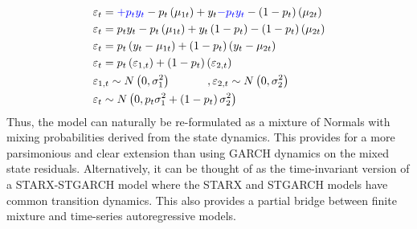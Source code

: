 \begin{equation}\label{eq:starmix}
\begin{gathered}
  {\varepsilon _t} =  {\color{blue}+ {p_t}{y_t}} - {p_t}\left( {{\mu _{1t}}}
  \right) + {y_t} {\color{blue} - {p_t}{y_t}} - \left( {1 - {p_t}} \right)\left(
  {{\mu _{2t}}} \right) \hfill \\
  {\varepsilon _t} = {p_t}{y_t} - {p_t}\left( {{\mu _{1t}}} \right) + {y_t}\left( {1 - {p_t}} \right) - \left( {1 - {p_t}} \right)\left( {{\mu _{2t}}} \right) \hfill \\
  {\varepsilon _t} = {p_t}\left( {{y_t} - {\mu _{1t}}} \right) + \left( {1 - {p_t}} \right)\left( {{y_t} - {\mu _{2t}}} \right) \hfill \\
  {\varepsilon _t} = {p_t}\left( {{\varepsilon _{1,t}}} \right) + \left( {1 - {p_t}} \right)\left( {{\varepsilon _{2,t}}} \right) \hfill \\
  {\varepsilon _{1,t}} \sim N\left( {0,\sigma _1^2} \right) \hfill, {\varepsilon
  _{2,t}} \sim N\left( {0,\sigma _2^2} \right) \hfill \\
  {\varepsilon _t} \sim N\left( {0,{p_t}\sigma _1^2 + \left( {1 - {p_t}}
  \right)\sigma _2^2} \right) \hfill \\
\end{gathered}
\end{equation}
Thus, the model can naturally be re-formulated as a mixture of Normals with
mixing probabilities derived from the state dynamics. This provides for a more
parsimonious and clear extension than using GARCH dynamics on the mixed state
residuals. Alternatively, it can be thought of as the time-invariant version of
a STARX-STGARCH model where the STARX and STGARCH models have common transition
dynamics. This also provides a partial bridge between finite mixture and
time-series autoregressive models.

